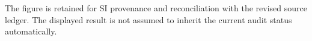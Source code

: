 The figure is retained for SI provenance and reconciliation with the revised source ledger. The displayed result is not assumed to inherit the current audit status automatically.

